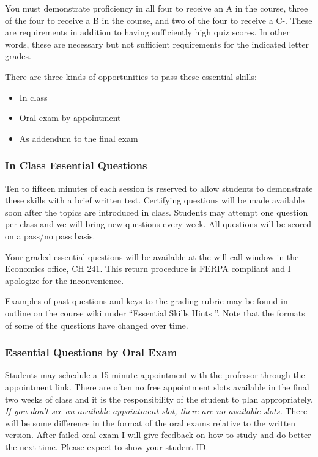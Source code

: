 \documentclass[letterpaper,10pt]{article}
\begin{document}
  
  You must demonstrate proficiency in all four to receive an A in the course, three of the four to receive a B in the course, and two of the four to receive a C-.  These are requirements in addition to having sufficiently high quiz scores.  In other words, these are necessary but not sufficient requirements for the indicated letter grades.
  
  There are three kinds of opportunities to pass these essential skills:
  \begin{itemize}
      \item In class
      \item Oral exam by appointment
      \item As addendum to the final exam
  \end{itemize}
  
   
  \subsubsection{In Class Essential Questions}
  
  Ten to fifteen minutes of each session is reserved to allow students to demonstrate these skills with a brief written test. Certifying questions will be made available soon after the topics are introduced in class. Students may attempt one question per class and we will bring new questions every week.  All questions will be scored on a pass/no pass basis. 
  
  Your graded essential questions will be available at the will call window in the Economics office, CH 241.  This return procedure is FERPA compliant and I apologize for the inconvenience.
  
  Examples of past questions and keys to the grading rubric may be found
  in outline on the course wiki under ``Essential Skills Hints ''.  Note that the formats of some of the questions have changed over time.
  
  \subsubsection{Essential Questions by Oral Exam}
  
  Students may schedule a 15 minute appointment with the professor through the appointment link. There are often no free appointment slots available in the final two weeks of class and it is the responsibility of the student to plan appropriately. \emph{If you don’t see an available appointment slot, there are no available slots.} There will be some difference in the format of the oral exams relative to the written version. After failed oral exam I will give feedback on how to study and do better the next time. Please expect to show your student ID.
  
\end{document}
